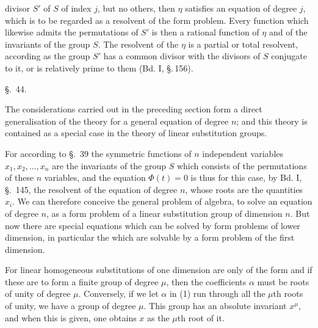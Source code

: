divisor $S'$ of $S$ of index $j$, but no others, then
$\eta$ satisfies an equation of degree $j$, which is to be regarded as a resolvent
of the form problem. Every function which likewise admits the
permutations of $S'$ is then a rational
function of $\eta$ and of the invariants of the group $S$. The
resolvent of the $\eta$ is a partial or total resolvent, according
as the group $S'$ has a common divisor with the divisors
of $S$ conjugate to it, or is relatively prime
to them (Bd. I, \S.\,156).

\begin{center}
\S.\ 44.

\end{center}

The considerations carried out in the preceding section
form a direct generalisation of the  theory
for a general equation of degree $n$; and this
theory is contained as a special case in the theory of linear substitution groups.

For according to \S.\ 39 the symmetric functions
of $n$ independent variables $x_1, x_2, \ldots, x_n$ are the invariants of the
group $S$ which consists of the permutations of these $n$ variables,
and the equation $\Phi(t) = 0$ is thus for this case, by Bd. I,
\S.\ 145, the  resolvent of the equation of degree $n$,
whose roots are the quantities $x_i$. We can therefore conceive the general problem of algebra, to solve an equation of degree $n$, as a form problem of a linear substitution group
of dimension $n$. But now there are special equations which can be solved by form problems of lower dimension,
in particular the 
which are solvable by a form problem of the first dimension.

For linear homogeneous substitutions of one dimension are
only of the form
and if these are to form a finite group of degree $\mu$,
then the coefficients $\alpha$ must be roots of unity of degree $\mu$.
Conversely, if we let $\alpha$ in (1) run through all the $\mu$th roots of unity,
we have a group of degree $\mu$. This
group has an absolute invariant $x^{\mu}$, and when this is given,
one obtains $x$ as the $\mu$th root of it.
